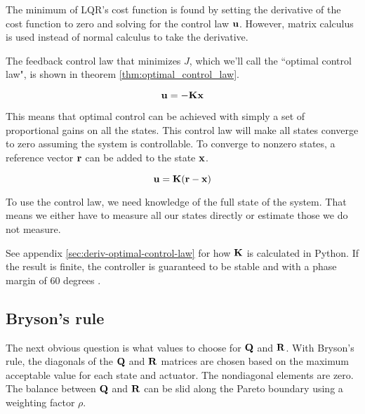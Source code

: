 The minimum of LQR's cost function is found by setting the derivative of the
cost function to zero and solving for the control law $\mathbf{u}$. However, matrix
calculus is used instead of normal calculus to take the derivative.

The feedback \gls{control law} that minimizes $J$, which we'll call the
``optimal control law", is shown in theorem \ref{thm:optimal_control_law}.

\begin{theorem}
  \begin{equation}
    \mathbf{u} = -\mathbf{K}\mathbf{x}
  \end{equation}
  \label{thm:optimal_control_law}
\end{theorem}

This means that optimal control can be achieved with simply a set of
proportional gains on all the states. This \gls{control law} will make all
states converge to zero assuming the system is controllable. To converge to
nonzero states, a reference vector $\mathbf{r}$ can be added to the state
$\mathbf{x}$.

\begin{theorem}
  \begin{equation}
    \mathbf{u} = \mathbf{K}(\mathbf{r} - \mathbf{x})
  \end{equation}
\end{theorem}

To use the control law, we need knowledge of the full state of the system. That
means we either have to measure all our states directly or estimate those we do
not measure.

See appendix \ref{sec:deriv-optimal-control-law} for how $\mathbf{K}$ is calculated
in Python. If the result is finite, the controller is guaranteed to be stable
and  with a \gls{phase margin} of 60 degrees
\cite{bib:lqr-phase-margin}.

\subsection{Bryson's rule}

The next obvious question is what values to choose for $\mathbf{Q}$ and $\mathbf{R}$.
With Bryson's rule, the diagonals of the $\mathbf{Q}$ and $\mathbf{R}$ matrices are
chosen based on the maximum acceptable value for each \gls{state} and actuator.
The nondiagonal elements are zero. The balance between $\mathbf{Q}$ and $\mathbf{R}$
can be slid along the Pareto boundary using a weighting factor $\rho$.

